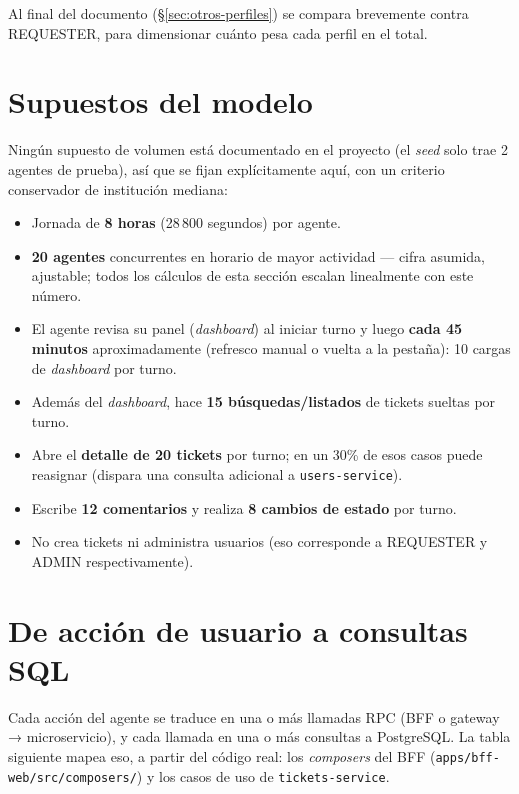 \documentclass[11pt,a4paper]{article}
\begin{document}
Al final del documento (\S\ref{sec:otros-perfiles}) se compara brevemente
contra REQUESTER, para dimensionar cuánto pesa cada perfil en el total.

\section{Supuestos del modelo}
\label{sec:supuestos}

Ningún supuesto de volumen está documentado en el proyecto (el \emph{seed}
solo trae 2 agentes de prueba), así que se fijan explícitamente aquí, con
un criterio conservador de institución mediana:

\begin{itemize}[leftmargin=1.2cm]
  \item Jornada de \textbf{8 horas} (28\,800 segundos) por agente.
  \item \textbf{20 agentes} concurrentes en horario de mayor actividad —
    cifra asumida, ajustable; todos los cálculos de esta sección escalan
    linealmente con este número.
  \item El agente revisa su panel (\emph{dashboard}) al iniciar turno y
    luego \textbf{cada 45 minutos} aproximadamente (refresco manual o
    vuelta a la pestaña): 10 cargas de \emph{dashboard} por turno.
  \item Además del \emph{dashboard}, hace \textbf{15 búsquedas/listados}
    de tickets sueltas por turno.
  \item Abre el \textbf{detalle de 20 tickets} por turno; en un 30\% de
    esos casos puede reasignar (dispara una consulta adicional a
    \texttt{users-service}).
  \item Escribe \textbf{12 comentarios} y realiza \textbf{8 cambios de
    estado} por turno.
  \item No crea tickets ni administra usuarios (eso corresponde a
    REQUESTER y ADMIN respectivamente).
\end{itemize}

\section{De acción de usuario a consultas SQL}

Cada acción del agente se traduce en una o más llamadas RPC (BFF o gateway
→ microservicio), y cada llamada en una o más consultas a PostgreSQL. La
tabla siguiente mapea eso, a partir del código real: los \emph{composers}
del BFF (\texttt{apps/bff-web/src/composers/}) y los casos de uso de
\texttt{tickets-service}.
\end{document}
